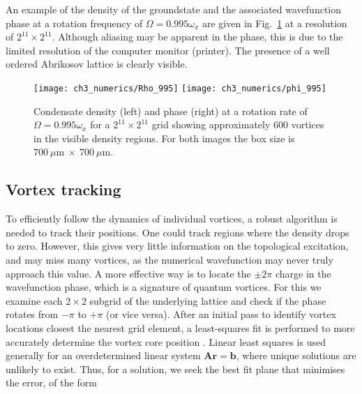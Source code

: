 An example of the density of the groundstate and the associated wavefunction phase at a rotation frequency of $\Omega = 0.995\omega_x$ are given in Fig.~\ref{fig:showingoff} at a resolution of $2^{11}\times 2^{11}$. Although aliasing may be apparent in the phase, this is due to the limited resolution of the computer monitor (printer). The presence of a well ordered Abrikosov lattice is clearly visible.

 \begin{figure}
     \centering
     \texttt{[image: ch3\_numerics/Rho\_995]}
     \texttt{[image: ch3\_numerics/phi\_995]}
     \caption{Condensate density (left) and phase (right) at a rotation rate of $\Omega=0.995\omega_x$ for a $2^{11}\times 2^{11}$ grid showing approximately 600 vortices in the visible density regions. For both images the box size is $700~\mu\textrm{m} ~\times ~700~\mu\textrm{m}$.}
     \label{fig:showingoff}
 \end{figure}

 \subsection{Vortex tracking}\label{sec:vortrack}
 To efficiently follow the dynamics of individual vortices, a robust algorithm is needed to track their positions. One could track regions where the density drops to zero. However, this gives very little information on the topological excitation, and may miss many vortices, as the numerical wavefunction may never truly approach this value. A more effective way is to locate the $\pm 2\pi$ charge in the wavefunction phase, which is a signature of quantum vortices. For this we examine each $2\times 2$ subgrid of the underlying lattice and check if the phase rotates from $-\pi$ to $+\pi$ (or vice versa). After an initial pass to identify vortex locations closest the nearest grid element, a least-squares fit is performed to more accurately determine the vortex core position \cite{c42f}. Linear least squares is used generally for an overdetermined linear system $\mathbf{A}\mathbf{r} = \mathbf{b}$, where unique solutions are unlikely to exist. Thus, for a solution, we seek the best fit plane that minimises the error, of the form

